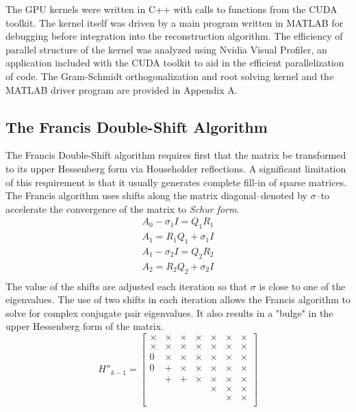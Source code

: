 \documentclass{article}
\begin{document}
The GPU kernels were written in C++ with calls to functions from the CUDA toolkit. The kernel itself was driven by a main program written in MATLAB for debugging before integration into the reconstruction algorithm. The efficiency of parallel structure of the kernel was analyzed using Nvidia Visual Profiler, an application included with the CUDA toolkit to aid in the efficient parallelization of code. The Gram-Schmidt orthogonalization and root solving kernel and the MATLAB driver program are provided in Appendix A.

\subsection*{The Francis Double-Shift Algorithm}

The Francis Double-Shift algorithm requires first that the matrix be transformed to its upper Hessenberg form via Householder reflections. A significant limitation of this requirement is that it usually generates complete fill-in of sparse matrices. The Francis algorithm uses shifts along the matrix diagonal--denoted by $\sigma$--to accelerate the convergence of the matrix to \emph{Schur form}.
$$\begin{array}{l}
A_0-\sigma_1I=Q_1R_1\\
A_1=R_1Q_1+\sigma_1I\\
A_1-\sigma_2I=Q_2R_2\\
A_2=R_2Q_2+\sigma_2I\\
\end{array}$$
The value of the shifts are adjusted each iteration so that $\sigma$ is close to one of the eigenvalues. The use of two shifts in each iteration allows the Francis algorithm to solve for complex conjugate pair eigenvalues. It also results in a "bulge" in the upper Hessenberg form of the matrix. 
$$H''_{k-1}=\left[\begin{array}{ccccccc}
\times & \times & \times & \times & \times & \times & \times \\
\times & \times & \times & \times & \times & \times & \times \\
0 & \times & \times & \times & \times & \times & \times \\
0 & + & \times & \times & \times & \times & \times \\
& + & + & \times & \times & \times & \times  \\
&&&& \times & \times & \times \\
&&&&& \times & \times \\
\end{array}\right]$$
\end{document}
